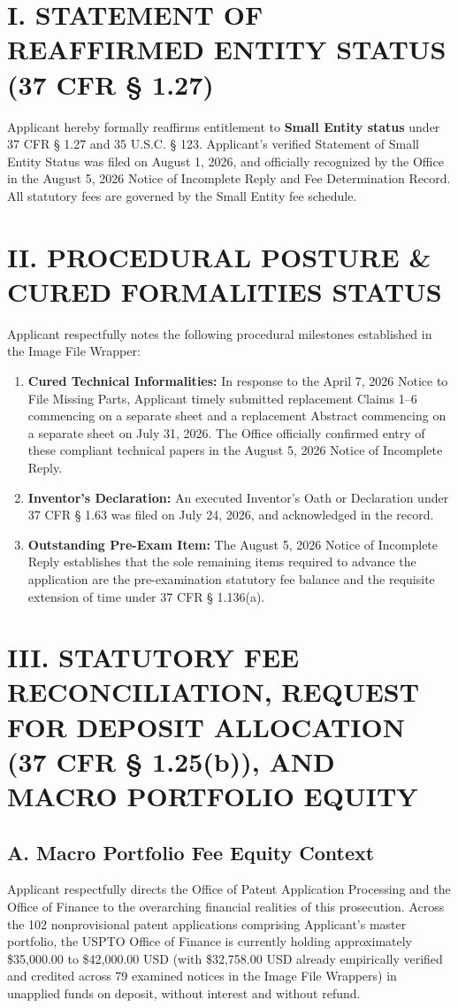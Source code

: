 \documentclass[11pt,letterpaper]{article}
\begin{document}
\section*{I. STATEMENT OF REAFFIRMED ENTITY STATUS (37 CFR \S{} 1.27)}

Applicant hereby formally reaffirms entitlement to \textbf{Small Entity status} under 37 CFR \S{} 1.27 and 35 U.S.C. \S{} 123. Applicant's verified Statement of Small Entity Status was filed on August 1, 2026, and officially recognized by the Office in the August 5, 2026 Notice of Incomplete Reply and Fee Determination Record. All statutory fees are governed by the Small Entity fee schedule.

\section*{II. PROCEDURAL POSTURE \& CURED FORMALITIES STATUS}

Applicant respectfully notes the following procedural milestones established in the Image File Wrapper:
\begin{enumerate}[leftmargin=*]
    \item \textbf{Cured Technical Informalities:} In response to the April 7, 2026 Notice to File Missing Parts, Applicant timely submitted replacement Claims 1--6 commencing on a separate sheet and a replacement Abstract commencing on a separate sheet on July 31, 2026. The Office officially confirmed entry of these compliant technical papers in the August 5, 2026 Notice of Incomplete Reply.
    \item \textbf{Inventor's Declaration:} An executed Inventor's Oath or Declaration under 37 CFR \S{} 1.63 was filed on July 24, 2026, and acknowledged in the record.
    \item \textbf{Outstanding Pre-Exam Item:} The August 5, 2026 Notice of Incomplete Reply establishes that the sole remaining items required to advance the application are the pre-examination statutory fee balance and the requisite extension of time under 37 CFR \S{} 1.136(a).
\end{enumerate}

\section*{III. STATUTORY FEE RECONCILIATION, REQUEST FOR DEPOSIT ALLOCATION (37 CFR \S{} 1.25(b)), AND MACRO PORTFOLIO EQUITY}

\subsection*{A. Macro Portfolio Fee Equity Context}
Applicant respectfully directs the Office of Patent Application Processing and the Office of Finance to the overarching financial realities of this prosecution. Across the 102 nonprovisional patent applications comprising Applicant's master portfolio, the USPTO Office of Finance is currently holding approximately \$35,000.00 to \$42,000.00 USD (with \$32,758.00 USD already empirically verified and credited across 79 examined notices in the Image File Wrappers) in unapplied funds on deposit, without interest and without refund.
\end{document}
